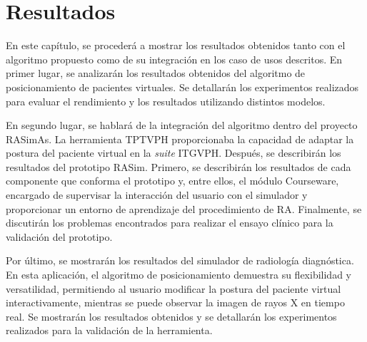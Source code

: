 \chapter{Resultados} 
\label{cap:results}

En este capítulo, se procederá a mostrar los resultados obtenidos tanto con el algoritmo propuesto como de su integración en los caso de usos descritos. 
%
En primer lugar, se analizarán los resultados obtenidos del algoritmo de posicionamiento de pacientes virtuales. Se detallarán los experimentos realizados para evaluar el rendimiento y los resultados utilizando distintos modelos.

En segundo lugar, se hablará de la integración del algoritmo dentro del proyecto \ac{RASimAs}. La herramienta \ac{TPTVPH} proporcionaba la capacidad de adaptar la postura del paciente virtual en la \emph{suite} \ac{ITGVPH}. %
Después, se describirán los resultados del prototipo \ac{RASim}. Primero, se describirán los resultados de cada componente que conforma el prototipo y, entre ellos, el módulo \acs{Courseware}, encargado de supervisar la interacción del usuario con el simulador y proporcionar un entorno de aprendizaje del procedimiento de \ac{RA}. Finalmente, se discutirán los problemas encontrados para realizar el ensayo clínico para la validación del prototipo. %

Por último, se mostrarán los resultados del simulador de radiología diagnóstica. En esta aplicación, el algoritmo de posicionamiento demuestra su flexibilidad y versatilidad, permitiendo al usuario modificar la postura del paciente virtual interactivamente, mientras se puede observar la imagen de rayos X en tiempo real. Se mostrarán los resultados obtenidos y se detallarán los experimentos realizados para la validación de la herramienta. %


